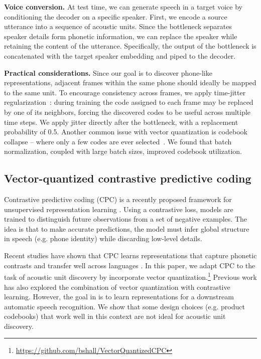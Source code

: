 \documentclass[a4paper]{article}
\begin{document}
\textbf{Voice conversion.}
At test time, we can generate speech in a target voice by conditioning the decoder on a specific speaker.
First, we encode a source utterance into a sequence of acoustic units.
Since the bottleneck separates speaker details form phonetic information, we can replace the speaker while retaining the content of the utterance.
Specifically, the output of the bottleneck is concatenated with the target speaker embedding and piped to the decoder.

\textbf{Practical considerations.}
Since our goal is to discover phone-like representations, adjacent frames within the same phone should ideally be mapped to the same unit.
To encourage consistency across frames, we apply time-jitter regularization~\cite{chorowski+etal_taslp19}: during training the code assigned to each frame may be replaced by one of its neighbors, forcing the discovered codes to be useful across multiple time steps.
We apply jitter directly after the bottleneck, with a replacement probability of 0.5.
Another common issue with vector quantization is codebook collapse -- where only a few codes are ever selected~\cite{kaiser+etal_icml18, baevski+etal_iclr20}. 
We found that batch normalization, coupled with large batch sizes, improved codebook utilization.

 \subsection{Vector-quantized contrastive predictive coding}
\label{sec:vqcpc}

Contrastive predictive coding (CPC) is a recently proposed framework for unsupervised representation learning \cite{vandenoord+etal_arxiv18}.
Using a contrastive loss, models are trained to distinguish future observations from a set of negative examples.
The idea is that to make accurate predictions, the model must infer global structure in speech (e.g. phone identity) while discarding low-level details.

Recent studies have shown that CPC learns representations that capture phonetic contrasts and transfer well across languages \cite{riviere+etal_icassp20, kahn_icassp20}.
In this paper, we adapt CPC to the task of acoustic unit discovery by incorporate vector quantization.\footnote{\scriptsize \url{https://github.com/bshall/VectorQuantizedCPC}}
Previous work \cite{baevski+etal_iclr20, hadjeres+crestel_arxiv20} has also explored the combination of vector quantization with contrastive learning.
However, the goal in \cite{baevski+etal_iclr20} is to learn representations for a downstream automatic speech recognition.
We show that some design choices (e.g. product codebooks) that work well in this context are not ideal for acoustic unit discovery.
\end{document}
